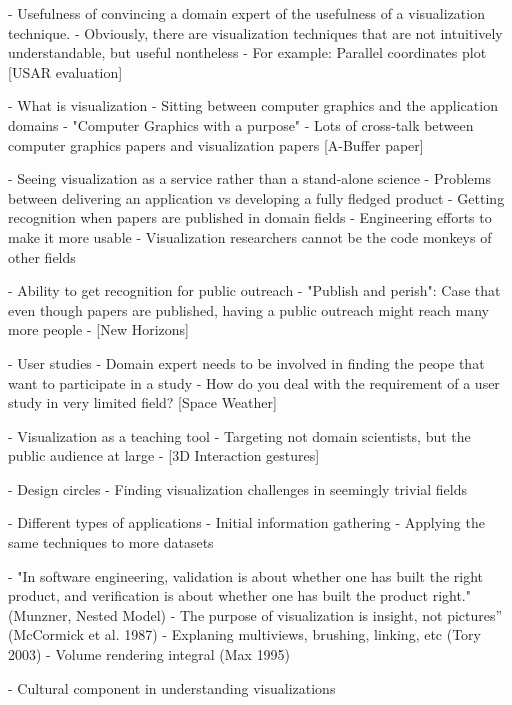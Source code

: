  - Usefulness of convincing a domain expert of the usefulness of a visualization technique.
 - Obviously, there are visualization techniques that are not intuitively understandable, but useful nontheless
 - For example: Parallel coordinates plot [USAR evaluation]

- What is visualization
 - Sitting between computer graphics and the application domains
 - "Computer Graphics with a purpose"
 - Lots of cross-talk between computer graphics papers and visualization papers [A-Buffer paper]

- Seeing visualization as a service rather than a stand-alone science
 - Problems between delivering an application vs developing a fully fledged product
 - Getting recognition when papers are published in domain fields
 - Engineering efforts to make it more usable
 - Visualization researchers cannot be the code monkeys of other fields

- Ability to get recognition for public outreach
 - "Publish and perish": Case that even though papers are published, having a public outreach might reach many more people
 - [New Horizons]

- User studies
 - Domain expert needs to be involved in finding the peope that want to participate in a study
 - How do you deal with the requirement of a user study in very limited field? [Space Weather]

- Visualization as a teaching tool
 - Targeting not domain scientists, but the public audience at large
 - [3D Interaction gestures]

- Design circles
- Finding visualization challenges in seemingly trivial fields

- Different types of applications
  - Initial information gathering
  - Applying the same techniques to more datasets

- "In software engineering, validation is about whether one has built the right product, and verification is about whether one has built the product right." (Munzner, Nested Model)
- The purpose of visualization is insight, not pictures” (McCormick et al. 1987)
- Explaning multiviews, brushing, linking, etc (Tory 2003)
- Volume rendering integral  (Max 1995)

- Cultural component in understanding visualizations